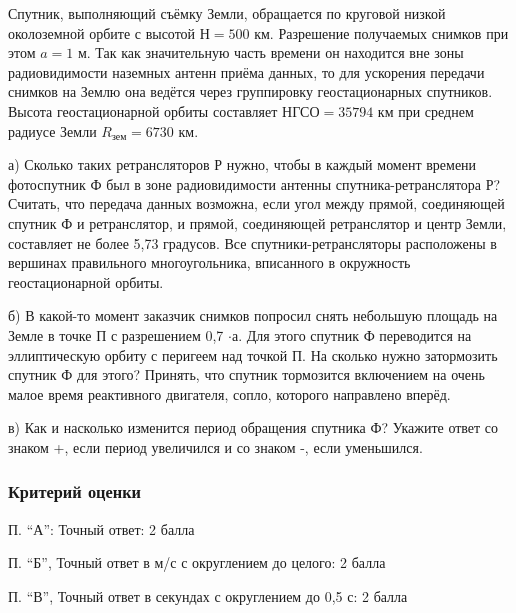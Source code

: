 
Спутник, выполняющий съёмку Земли, обращается по круговой низкой околоземной орбите с высотой $Н=500$ км. 
Разрешение получаемых снимков при этом $a=1$ м. Так как значительную часть времени он находится вне зоны 
радиовидимости наземных антенн приёма данных, то для ускорения передачи снимков на Землю она ведётся 
через группировку геостационарных спутников. Высота геостационарной орбиты составляет $\text{НГСО} = 35794$ 
км при среднем радиусе Земли $R_{\text{зем}} = 6730$ км. 

а) Сколько таких ретрансляторов Р нужно, чтобы в каждый момент времени фотоспутник Ф был в зоне радиовидимости антенны спутника-ретранслятора Р? Считать, что передача данных возможна, если угол между прямой, соединяющей спутник Ф и ретранслятор, и прямой, соединяющей ретранслятор и центр Земли, составляет не более 5,73 градусов. Все спутники-ретрансляторы расположены в вершинах правильного многоугольника, вписанного в окружность геостационарной орбиты.

б) В какой-то момент заказчик снимков попросил снять небольшую площадь на Земле в точке П с разрешением 0,7 $\cdot$а. 
Для этого спутник Ф переводится на эллиптическую орбиту с перигеем над точкой П. На сколько нужно затормозить спутник Ф для этого? 
Принять, что спутник тормозится включением на очень малое время реактивного двигателя, сопло, которого направлено вперёд.

в) Как и насколько изменится период обращения спутника Ф? Укажите ответ со знаком +, если период увеличился и со знаком -, если уменьшился.

\subsubsection*{Критерий оценки}

П. “А”: Точный ответ: 2 балла

П. “Б”, Точный ответ в м/с с округлением до целого: 2 балла

П. “В”, Точный ответ в секундах с округлением до 0,5 с: 2 балла
